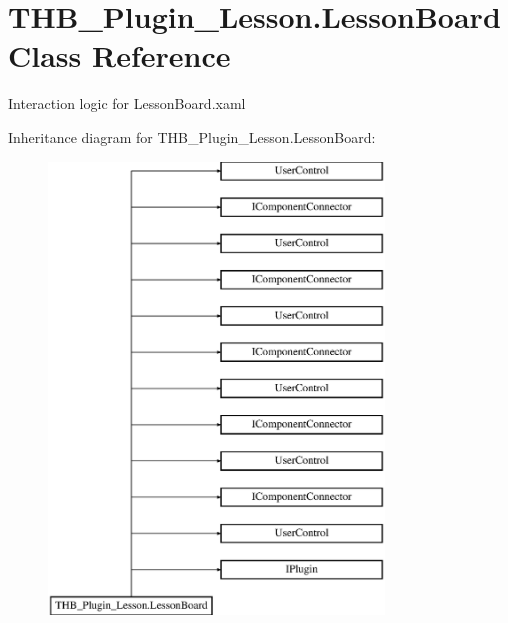 \hypertarget{class_t_h_b___plugin___lesson_1_1_lesson_board}{}\section{T\+H\+B\+\_\+\+Plugin\+\_\+\+Lesson.\+Lesson\+Board Class Reference}
\label{class_t_h_b___plugin___lesson_1_1_lesson_board}


Interaction logic for Lesson\+Board.\+xaml  


Inheritance diagram for T\+H\+B\+\_\+\+Plugin\+\_\+\+Lesson.\+Lesson\+Board\+:\begin{figure}[H]
\begin{center}
\leavevmode
\includegraphics[height=12.000000cm]{d1/d3b/class_t_h_b___plugin___lesson_1_1_lesson_board}
\end{center}
\end{figure}
